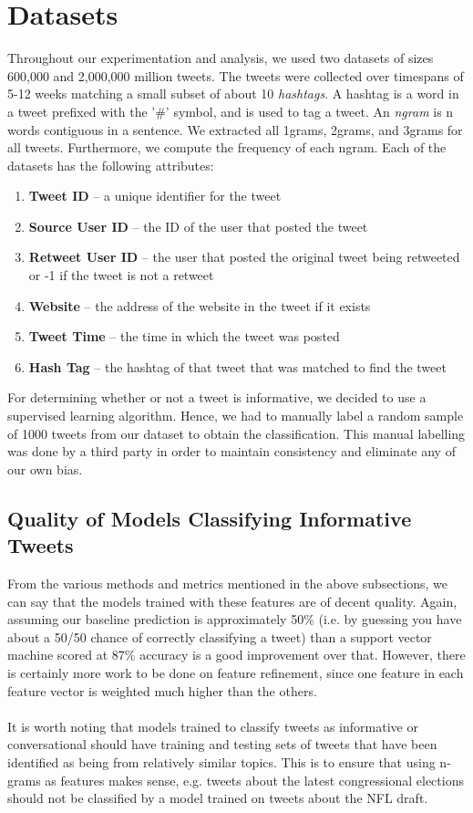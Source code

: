 \documentclass[12pt]{article}
\begin{document}
\section{Datasets}
Throughout our experimentation and analysis, we used two datasets of sizes 600,000 and 2,000,000 million tweets. The tweets were collected over timespans of 5-12 weeks matching a small subset of about 10 {\it hashtags}. A hashtag is a word in a tweet prefixed with the '\#' symbol, and is used to tag a tweet. An {\it ngram} is n words contiguous in a sentence. We extracted all 1grams, 2grams, and 3grams for all tweets. Furthermore, we compute the frequency of each ngram. Each of the datasets has the following attributes:
\begin{enumerate}
	\item \textbf{Tweet ID} -- a unique identifier for the tweet
	\item \textbf{Source User ID} -- the ID of the user that posted the tweet
	\item \textbf{Retweet User ID} -- the user that posted the original tweet being retweeted or -1 if the tweet is not a retweet
	\item \textbf{Website} -- the address of the website in the tweet if it exists
	\item \textbf{Tweet Time} -- the time in which the tweet was posted
	\item \textbf{Hash Tag} -- the hashtag of that tweet that was matched to find the tweet
\end{enumerate}
For determining whether or not a tweet is informative, we decided to use a supervised learning algorithm. Hence, we had to manually label a random sample of 1000 tweets from our dataset to obtain the classification. This manual labelling was done by a third party in order to maintain consistency and eliminate any of our own bias.
\subsection{Quality of Models Classifying Informative Tweets}
From the various methods and metrics mentioned in the above subsections, we can say that the models trained with these features are of decent quality. Again, assuming our baseline prediction is approximately 50\% (i.e. by guessing you have about a 50/50 chance of correctly classifying a tweet) than a support vector machine scored at 87\% accuracy is a good improvement over that. However, there is certainly more work to be done on feature refinement, since one feature in each feature vector is weighted much higher than the others. \\
\\
It is worth noting that models trained to classify tweets as informative or conversational should have training and testing sets of tweets that have been identified as being from relatively similar topics. This is to ensure that using n-grams as features makes sense, e.g. tweets about the latest congressional elections should not be classified by a model trained on tweets about the NFL draft. 
\end{document}
